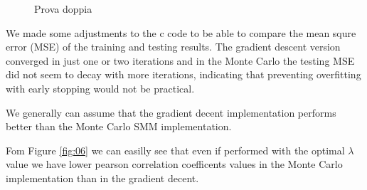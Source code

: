 \documentclass{bioinfo}
\begin{document}
\begin{application}
\begin{figure}[!tpb]
\begin{center}
\end{center}
\caption{Prova doppia}
\label{fig:07}
\end{figure}
\par We made some adjustments to the c code to be able to compare the mean squre error (MSE) of the training and testing results. The gradient descent version converged in just one or two iterations and in the Monte Carlo the testing MSE did not seem to decay with more iterations, indicating that preventing overfitting with early stopping would not be practical.

\par We generally can assume that the gradient decent implementation performs better than the Monte Carlo SMM implementation. 
\par Fom Figure \ref{fig:06} we can easilly see that even if performed with the optimal $\lambda$ value we have lower pearson correlation coefficents values in the Monte Carlo implementation than in the gradient decent.







%
%
%
%
%






\end{application}
\end{document}
